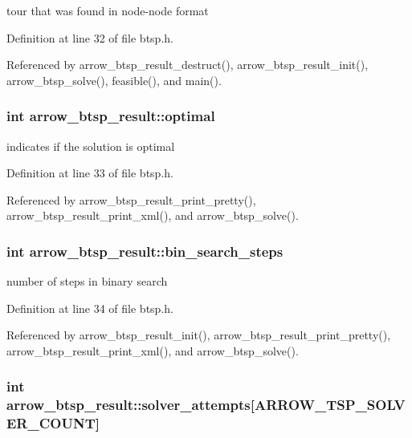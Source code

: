 tour that was found in node-node format 

Definition at line 32 of file btsp.h.

Referenced by arrow\_\-btsp\_\-result\_\-destruct(), arrow\_\-btsp\_\-result\_\-init(), arrow\_\-btsp\_\-solve(), feasible(), and main().\hypertarget{structarrow__btsp__result_febcf61e24bf277eeb7795c18bd42b8b}{
\subsubsection{\setlength{\rightskip}{0pt plus 5cm}int {\bf arrow\_\-btsp\_\-result::optimal}}}
\label{structarrow__btsp__result_febcf61e24bf277eeb7795c18bd42b8b}


indicates if the solution is optimal 

Definition at line 33 of file btsp.h.

Referenced by arrow\_\-btsp\_\-result\_\-print\_\-pretty(), arrow\_\-btsp\_\-result\_\-print\_\-xml(), and arrow\_\-btsp\_\-solve().\hypertarget{structarrow__btsp__result_80106c5f0b8f82353ad6771ad9eaac71}{
\subsubsection{\setlength{\rightskip}{0pt plus 5cm}int {\bf arrow\_\-btsp\_\-result::bin\_\-search\_\-steps}}}
\label{structarrow__btsp__result_80106c5f0b8f82353ad6771ad9eaac71}


number of steps in binary search 

Definition at line 34 of file btsp.h.

Referenced by arrow\_\-btsp\_\-result\_\-init(), arrow\_\-btsp\_\-result\_\-print\_\-pretty(), arrow\_\-btsp\_\-result\_\-print\_\-xml(), and arrow\_\-btsp\_\-solve().\hypertarget{structarrow__btsp__result_b1d423ab6eda81de4c3bde1685976593}{
\subsubsection{\setlength{\rightskip}{0pt plus 5cm}int {\bf arrow\_\-btsp\_\-result::solver\_\-attempts}\mbox{[}ARROW\_\-TSP\_\-SOLVER\_\-COUNT\mbox{]}}}
\label{structarrow__btsp__result_b1d423ab6eda81de4c3bde1685976593}


